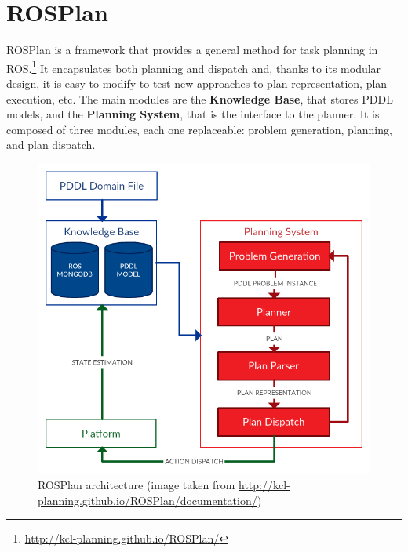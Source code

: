 \documentclass[pdftex,12pt,a4paper]{report}
\begin{document}
\section{ROSPlan}\label{rosplan}
ROSPlan is a framework that provides a general method for task planning in ROS.\footnote{\url{http://kcl-planning.github.io/ROSPlan/}}
It encapsulates both planning and dispatch and, thanks to its modular design, it is easy to modify to test new approaches to plan representation, plan execution, etc.
The main modules are the \textbf{Knowledge Base}, that stores PDDL models, and the \textbf{Planning System}, that is the interface to the planner. It is composed of three modules, each one replaceable: problem generation, planning, and plan dispatch. 
\begin{figure}[H]
	\centering
	\includegraphics[scale=0.4]{images/overview.png}
	\caption{ROSPlan architecture (image taken from \url{http://kcl-planning.github.io/ROSPlan/documentation/})}
\end{figure} 
\end{document}
